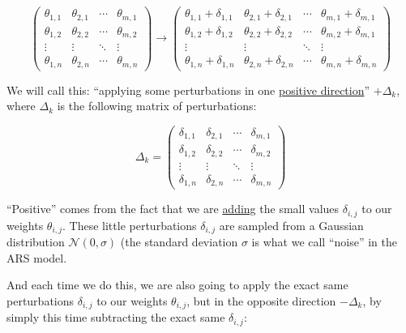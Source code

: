 \documentclass[]{book}
\begin{document}
\begin{equation*}
\begin{pmatrix}
\theta_{1,1} & \theta_{2,1} & \cdots & \theta_{m,1} \\
\theta_{1,2} & \theta_{2,2} & \cdots & \theta_{m,2} \\
\vdots & \vdots & \ddots & \vdots \\
\theta_{1,n} & \theta_{2,n} & \cdots & \theta_{m,n}
\end{pmatrix}
\longrightarrow
\begin{pmatrix}
\theta_{1,1} + \delta_{1,1} & \theta_{2,1} + \delta_{2,1} & \cdots & \theta_{m,1} + \delta_{m,1} \\
\theta_{1,2} + \delta_{1,2} & \theta_{2,2} + \delta_{2,2} & \cdots & \theta_{m,2} + \delta_{m,1} \\
\vdots & \vdots & \ddots & \vdots \\
\theta_{1,n} + \delta_{1,n} & \theta_{2,n} + \delta_{2,n} & \cdots & \theta_{m,n} + \delta_{m,n}
\end{pmatrix}
\end{equation*}

We will call this: ``applying some perturbations in one \underline{positive direction}'' \(+\Delta_k\), where \(\Delta_k\) is the following matrix of perturbations:

\begin{equation*}
\Delta_k
=
\begin{pmatrix}
\delta_{1,1} & \delta_{2,1} & \cdots & \delta_{m,1} \\
\delta_{1,2} & \delta_{2,2} & \cdots & \delta_{m,2} \\
\vdots & \vdots & \ddots & \vdots \\
\delta_{1,n} & \delta_{2,n} & \cdots & \delta_{m,n}
\end{pmatrix}
\end{equation*}

``Positive'' comes from the fact that we are \underline{adding} the small values \(\delta_{i,j}\) to our weights \(\theta_{i,j}\). These little perturbations \(\delta_{i,j}\) are sampled from a Gaussian distribution \(\mathcal{N}(0,\sigma)\) (the standard deviation \(\sigma\) is what we call ``noise'' in the ARS model.

And each time we do this, we are also going to apply the exact same perturbations \(\delta_{i,j}\) to our weights \(\theta_{i,j}\), but in the opposite direction \(-\Delta_k\), by simply this time subtracting the exact same \(\delta_{i,j}\):
\end{document}

